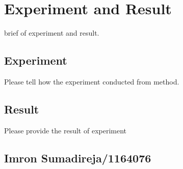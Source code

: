 \chapter{Experiment and Result}
brief of experiment and result.
\section{Experiment}
Please tell how the experiment conducted from method.

\section{Result}
Please provide the result of experiment

\section{Imron Sumadireja/1164076}
